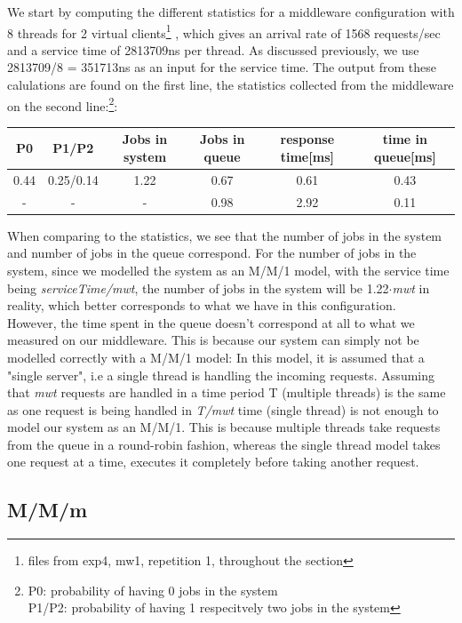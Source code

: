 \documentclass[11pt,a4paper]{article}
\begin{document}
We start by computing the different statistics for a middleware configuration with 8 threads for 2 virtual clients\footnote{files from exp4, mw1, repetition 1, throughout the section} , which gives an arrival rate of 1568 requests/sec and a service time of 2813709ns per thread. As discussed previously, we use 2813709/8 = 351713ns as an input for the service time. The output from these calulations are found on the first line, the statistics collected from the middleware on the second line:\footnote{P0: probability of having 0 jobs in the system\\P1/P2: probability of having 1 respecitvely two jobs in the system}: 
\begin{center}

		\begin{tabular}{|c|c|c|c|c|c|}
			  \hline
			  \textbf{P0} & \textbf{P1/P2} & \textbf{Jobs in system} & \textbf{Jobs in queue} & \textbf{response time[ms]} & \textbf{time in queue[ms]}\\
			  \hline
			  0.44 & 0.25/0.14 & 1.22 & 0.67 & 0.61 & 0.43 \\
			  - & - & - & 0.98  & 2.92 & 0.11 \\
			  \hline
		\end{tabular}
 
\end{center}
When comparing to the statistics, we see that the number of jobs in the system and number of jobs in the queue correspond. For the number of jobs in the system, since we modelled the system as an M/M/1 model, with the service time being \textit{serviceTime/mwt}, the number of jobs in the system will be 1.22$\cdot$\textit{mwt} in reality, which better corresponds to what we have in this configuration. 
 \\
However, the time spent in the queue doesn't correspond at all to what we measured on our middleware. This is because our system can simply not be modelled correctly with a M/M/1 model: In this model, it is assumed that a "single server", i.e a single thread is handling the incoming requests. Assuming that \textit{mwt} requests are handled in a time period T (multiple threads) is the same as one request is being handled in \textit{T/mwt} time (single thread) is not enough to model our system as an M/M/1. This is because multiple threads take requests from the queue in a round-robin fashion, whereas the single thread model takes one request at a time, executes it completely before taking another request. 

  
\subsection{M/M/m}
\end{document}
